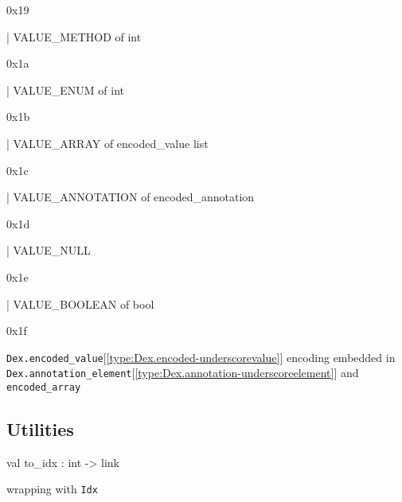 \documentclass[11pt]{article}
\begin{document}
\begin{ocamldoccomment}
0x19
\end{ocamldoccomment}
\begin{ocamldoccode}
  | VALUE_METHOD of int
\end{ocamldoccode}
\begin{ocamldoccomment}
0x1a
\end{ocamldoccomment}
\begin{ocamldoccode}
  | VALUE_ENUM of int
\end{ocamldoccode}
\begin{ocamldoccomment}
0x1b
\end{ocamldoccomment}
\begin{ocamldoccode}
  | VALUE_ARRAY of encoded_value list
\end{ocamldoccode}
\begin{ocamldoccomment}
0x1c
\end{ocamldoccomment}
\begin{ocamldoccode}
  | VALUE_ANNOTATION of encoded_annotation
\end{ocamldoccode}
\begin{ocamldoccomment}
0x1d
\end{ocamldoccomment}
\begin{ocamldoccode}
  | VALUE_NULL
\end{ocamldoccode}
\begin{ocamldoccomment}
0x1e
\end{ocamldoccomment}
\begin{ocamldoccode}
  | VALUE_BOOLEAN of bool
\end{ocamldoccode}
\begin{ocamldoccomment}
0x1f
\end{ocamldoccomment}
\begin{ocamldocdescription}
{\tt{Dex.encoded\_value}}[\ref{type:Dex.encoded-underscorevalue}] encoding
 embedded in {\tt{Dex.annotation\_element}}[\ref{type:Dex.annotation-underscoreelement}] and {\tt{encoded\_array}}


\end{ocamldocdescription}




\subsection{Utilities}




\label{val:Dex.to-underscoreidx}\begin{ocamldoccode}
val to_idx : int -> link
\end{ocamldoccode}
\begin{ocamldocdescription}
wrapping with {\tt{Idx}}


\end{ocamldocdescription}
\end{document}

